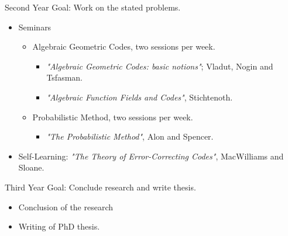 \begin{frame}{Second Year}
Goal: Work on the stated problems.
\begin{itemize}
\item Seminars
\begin{itemize}
\item Algebraic Geometric Codes, two sessions per week.
\begin{itemize}
\item \textit{"Algebraic Geometric Codes: basic notions"}; Vladut, Nogin and Tsfasman.
\item \textit{"Algebraic Function Fields and Codes"}, Stichtenoth.
\end{itemize}
\item Probabilistic Method, two sessions per week.
\begin{itemize}
\item \textit{"The Probabilistic Method"}, Alon and Spencer.
\end{itemize}
\end{itemize}
\item Self-Learning: \textit{"The Theory of Error-Correcting Codes"}, MacWilliams and Sloane.
\end{itemize}
\end{frame}

\begin{frame}{Third Year}
Goal: Conclude research and write thesis.
\begin{itemize}
\item Conclusion of the research
\item Writing of PhD thesis.
\end{itemize}
\end{frame}